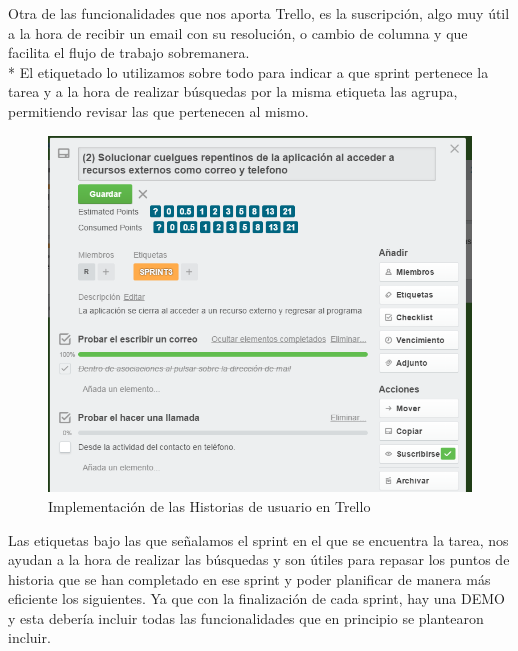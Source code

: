 \documentclass[../pfc.tex]{subfiles}
\begin{document}
	\clearpage
	
	Otra de las funcionalidades que nos aporta Trello, es la suscripción, algo muy útil a la hora de recibir un email con su resolución, o cambio de columna y que facilita el flujo de trabajo sobremanera.\\*
	El etiquetado lo utilizamos sobre todo para indicar a que sprint pertenece la tarea y a la hora de realizar búsquedas por la misma etiqueta las agrupa, permitiendo revisar las que pertenecen al mismo.
	
		\begin{figure}[H]
			\centering
			\includegraphics[width=1\linewidth]{../images/tarea2}
			\caption{Implementación de las Historias de usuario en Trello}
			\label{fig:tareaTrello}
		\end{figure}
		
	Las etiquetas bajo las que señalamos el sprint en el que se encuentra la tarea, nos ayudan a la hora de realizar las búsquedas y son útiles para repasar los puntos de historia que se han completado en ese sprint y poder planificar de manera más eficiente los siguientes. Ya que con la finalización de cada sprint, hay una DEMO y esta debería incluir todas las funcionalidades que en principio se plantearon incluir.
		
\end{document}
